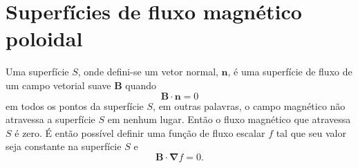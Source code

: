\documentclass[12pt,oneside,a4paper]{abntex2}
\begin{document}
\section{Superfícies de fluxo magnético poloidal}
\noindent Uma superfície $S$, onde defini-se um vetor normal, $\bm{n}$, é uma superfície de fluxo de um campo vetorial suave $\bm{B}$ quando
\begin{equation}
\bm{B} \cdot \bm{n}= 0 
\end{equation}
em todos os pontos da superfície $S$, em outras palavras, o campo magnético não atravessa a superfície $S$ em nenhum lugar. 
Então o fluxo magnético que atravessa $S$ é zero. É então possível definir uma função de fluxo escalar $f$ tal que seu valor seja constante na superfície $S$ e
\begin{equation}
\bm{B} \cdot \bm{\nabla} f = 0.
\end{equation}
\end{document}
